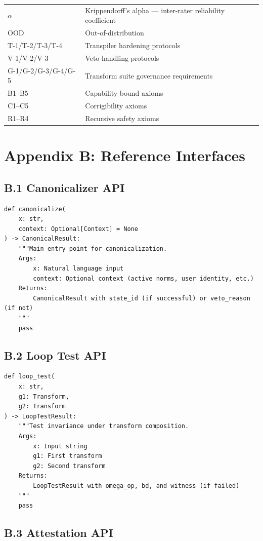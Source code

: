 \documentclass[11pt,letterpaper]{article}
\theoremstyle{definition}
\theoremstyle{remark}
\begin{document}
\begin{longtable}{@{}lp{10cm}@{}}
$\alpha$ & Krippendorff's alpha --- inter-rater reliability coefficient \\
OOD & Out-of-distribution \\
T-1/T-2/T-3/T-4 & Transpiler hardening protocols \\
V-1/V-2/V-3 & Veto handling protocols \\
G-1/G-2/G-3/G-4/G-5 & Transform suite governance requirements \\
B1--B5 & Capability bound axioms \\
C1--C5 & Corrigibility axioms \\
R1--R4 & Recursive safety axioms \\
\bottomrule
\end{longtable}


\section*{Appendix B: Reference Interfaces}

\subsection*{B.1 Canonicalizer API}

\begin{lstlisting}
def canonicalize(
    x: str,
    context: Optional[Context] = None
) -> CanonicalResult:
    """Main entry point for canonicalization.
    Args:
        x: Natural language input
        context: Optional context (active norms, user identity, etc.)
    Returns:
        CanonicalResult with state_id (if successful) or veto_reason (if not)
    """
    pass
\end{lstlisting}

\subsection*{B.2 Loop Test API}

\begin{lstlisting}
def loop_test(
    x: str,
    g1: Transform,
    g2: Transform
) -> LoopTestResult:
    """Test invariance under transform composition.
    Args:
        x: Input string
        g1: First transform
        g2: Second transform
    Returns:
        LoopTestResult with omega_op, bd, and witness (if failed)
    """
    pass
\end{lstlisting}

\subsection*{B.3 Attestation API}
\end{document}
